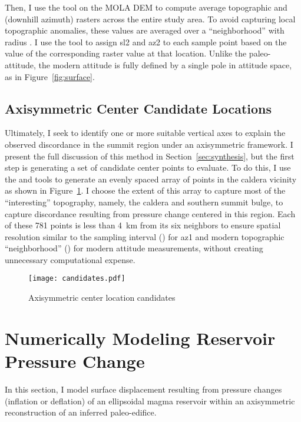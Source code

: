 Then, I use the  tool on the \ac{MOLA} \ac{DEM} to compute average topographic  and  (downhill azimuth) rasters across the entire study area. To avoid capturing local topographic anomalies, these values are averaged over a ``neighborhood'' with radius \neighborhood. I use the  tool to assign \ac{sl2} and \ac{az2} to each sample point based on the value of the corresponding raster value at that location. Unlike the paleo-attitude, the modern attitude is fully defined by a single pole in attitude space, as in Figure~\ref{fig:surface}.

\subsection{Axisymmetric Center Candidate Locations}\label{sec:candidates}

Ultimately, I seek to identify one or more suitable vertical axes to explain the observed discordance in the summit region under an axisymmetric framework. I present the full discussion of this method in Section~\ref{sec:synthesis}, but the first step is generating a set of candidate center points to evaluate. To do this, I use the  and  tools to generate an evenly spaced array of points in the caldera vicinity as shown in Figure~\ref{fig:candidates}. I choose the extent of this array to capture most of the ``interesting'' topography, namely, the caldera and southern summit bulge, to capture discordance resulting from pressure change centered in this region. Each of these 781 points is less than \qty{4}{\km} from its six neighbors to ensure spatial resolution similar to the sampling interval (\samplinginterval) for \acl{az1} and modern topographic ``neighborhood'' (\neighborhood) for modern attitude measurements, without creating unnecessary computational expense.

\begin{figure}
    \texttt{[image: candidates.pdf]}%
    \caption{Axisymmetric center location candidates}%
    \label{fig:candidates}
\end{figure}

\section{Numerically Modeling Reservoir Pressure Change}\label{sec:modeling}

In this section, I model surface displacement resulting from pressure changes (inflation or deflation) of an ellipsoidal magma reservoir within an axisymmetric reconstruction of an inferred paleo-edifice.

